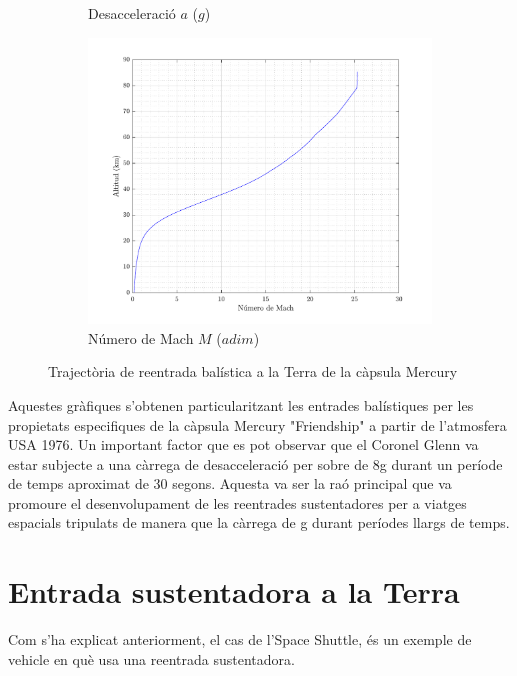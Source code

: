 \begin{figure}[ht]
\begin{subfigure}{.37\textwidth}
        \caption{Desacceleració $a$ ($g$)}
    \end{subfigure}
        \begin{subfigure}{.37\textwidth}
        \centering
        \includegraphics[width=\linewidth]{imagenes/09_mercury_graficas/mach_no_title.pdf}
        \caption{Número de Mach $M$ ($adim$)}
    \end{subfigure}%
    \caption{Trajectòria de reentrada balística a la Terra de la càpsula Mercury}
    \label{fig:mercury_capsule}
\end{figure}

Aquestes gràfiques s'obtenen particularitzant les entrades balístiques per les propietats especifiques de la càpsula Mercury "Friendship" a partir de l'atmosfera USA 1976. Un important factor que es pot observar que el Coronel Glenn va estar subjecte a una càrrega de desacceleració per sobre de 8g durant un període de temps aproximat de 30 segons. \newline
Aquesta va ser la raó principal que va promoure el desenvolupament de les reentrades sustentadores per a viatges espacials tripulats de manera que la càrrega de g durant períodes llargs de temps.

\newpage
\section{Entrada sustentadora a la Terra}

Com s'ha explicat anteriorment, el cas de l'Space Shuttle, és un exemple de vehicle en què usa una reentrada sustentadora.

